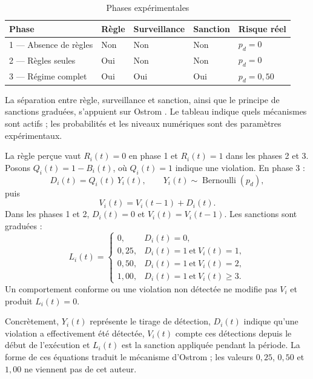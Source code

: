 \documentclass[10pt,a4paper]{article}
\begin{document}
\begin{table}[H]
\centering
\caption{Phases expérimentales}
\begin{tabularx}{\textwidth}{@{}L{42mm}C{18mm}C{24mm}C{19mm}Y@{}}
\toprule
{}
\color{white}\textbf{Phase} &
\color{white}\textbf{Règle} &
\color{white}\textbf{Surveillance} &
\color{white}\textbf{Sanction} &
\color{white}\textbf{Risque réel}\\
 — Absence de règles & Non & Non & Non & $p_d=0$\\
2 — Règles seules & Oui & Non & Non & $p_d=0$\\
3 — Régime complet & Oui & Oui & Oui & $p_d=0{,}50$\\
\bottomrule
\end{tabularx}
\end{table}

La séparation entre règle, surveillance et sanction, ainsi que le principe de
sanctions graduées, s’appuient sur Ostrom \cite{ostrom1990}. Le tableau indique
quels mécanismes sont actifs ; les probabilités et les niveaux numériques sont
des paramètres expérimentaux.

La règle perçue vaut $R_i(t)=0$ en phase 1 et $R_i(t)=1$ dans les phases 2 et
3. Posons $Q_i(t)=1-B_i(t)$, où $Q_i(t)=1$ indique une violation. En phase 3 :
\[
D_i(t)=Q_i(t)\,Y_i(t),\qquad
Y_i(t)\sim\operatorname{Bernoulli}(p_d),
\]
puis
\[
V_i(t)=V_i(t-1)+D_i(t).
\]
Dans les phases 1 et 2, $D_i(t)=0$ et $V_i(t)=V_i(t-1)$. Les sanctions sont
graduées :
\[
L_i(t)=
\begin{cases}
0,&D_i(t)=0,\\
0{,}25,&D_i(t)=1\ \text{et}\ V_i(t)=1,\\
0{,}50,&D_i(t)=1\ \text{et}\ V_i(t)=2,\\
1{,}00,&D_i(t)=1\ \text{et}\ V_i(t)\geq3.
\end{cases}
\]
Un comportement conforme ou une violation non détectée ne modifie pas $V_i$
et produit $L_i(t)=0$.

Concrètement, $Y_i(t)$ représente le tirage de détection, $D_i(t)$ indique
qu’une violation a effectivement été détectée, $V_i(t)$ compte ces détections
depuis le début de l’exécution et $L_i(t)$ est la sanction appliquée pendant la
période. La forme de ces équations traduit le mécanisme d’Ostrom ; les valeurs
$0{,}25$, $0{,}50$ et $1{,}00$ ne viennent pas de cet auteur.
\end{document}
